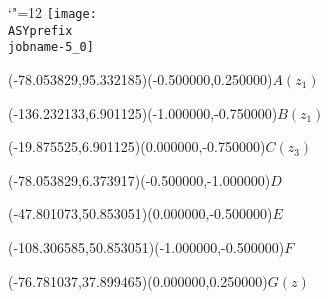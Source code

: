\setlength{\unitlength}{1pt}%
\makeatletter%
\let\ASYencoding\f@encoding%
\let\ASYfamily\f@family%
\let\ASYseries\f@series%
\let\ASYshape\f@shape%
\makeatother%
{\catcode`"=12%
\texttt{[image: \\ASYprefix\\jobname-5\_0]}%
}%
%
\fontsize{6.000000}{7.200000}\selectfont%
\usefont{\ASYencoding}{\ASYfamily}{\ASYseries}{\ASYshape}%
\ASYalign(-78.053829,95.332185)(-0.500000,0.250000){$A(z_1)$}%
%
\fontsize{6.000000}{7.200000}\selectfont%
\ASYalign(-136.232133,6.901125)(-1.000000,-0.750000){$B(z_1)$}%
%
\fontsize{6.000000}{7.200000}\selectfont%
\ASYalign(-19.875525,6.901125)(0.000000,-0.750000){$C(z_3)$}%
%
\fontsize{6.000000}{7.200000}\selectfont%
\ASYalign(-78.053829,6.373917)(-0.500000,-1.000000){$D$}%
%
\fontsize{6.000000}{7.200000}\selectfont%
\ASYalign(-47.801073,50.853051)(0.000000,-0.500000){$E$}%
%
\fontsize{6.000000}{7.200000}\selectfont%
\ASYalign(-108.306585,50.853051)(-1.000000,-0.500000){$F$}%
%
\fontsize{6.000000}{7.200000}\selectfont%
\ASYalign(-76.781037,37.899465)(0.000000,0.250000){$G(z)$}%

